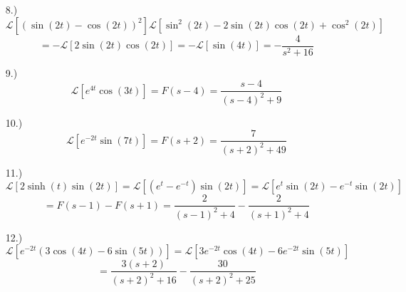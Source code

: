 \documentclass[12pt]{article}
\newcommand{\bracks}[1]{\left[#1\right]}
\newcommand{\parns}[1]{\left(#1\right)}
\newcommand{\lgr}{\mathcal{L}}
\begin{document}
\begin{itemize}
    \item [8.)] \[\lgr\bracks{(\sin(2t)-\cos(2t))^2}\lgr\bracks{\sin^2(2t)-2\sin(2t)\cos(2t)+\cos^2(2t)}\]
    \[=-\lgr\bracks{2\sin(2t)\cos(2t)}=-\lgr\bracks{\sin(4t)}=-\frac{4}{s^2+16}\]

    \item [9.)] \[\lgr\bracks{e^{4t}\cos(3t)}=F(s-4)=\frac{s-4}{(s-4)^2+9}\]

    \item [10.)] \[\lgr\bracks{e^{-2t}\sin(7t)}=F(s+2)=\frac{7}{(s+2)^2+49}\]

    \item [11.)] \[\lgr\bracks{2\sinh(t)\sin(2t)}=\lgr\bracks{\parns{e^t-e^{-t}}\sin(2t)}=\lgr\bracks{e^t\sin(2t)-e^{-t}\sin(2t)}\]
    \[=F(s-1)-F(s+1)=\frac{2}{(s-1)^2+4}-\frac{2}{(s+1)^2+4}\]

    \item [12.)] \[\lgr\bracks{e^{-2t}(3\cos(4t)-6\sin(5t))}=\lgr\bracks{3e^{-2t}\cos(4t)-6e^{-2t}\sin(5t)}\]
    \[=\frac{3(s+2)}{(s+2)^2+16}-\frac{30}{(s+2)^2+25}\]
\end{itemize}
\end{document}
